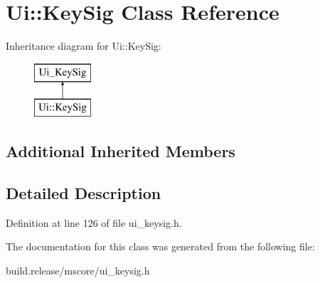 \hypertarget{class_ui_1_1_key_sig}{}\section{Ui\+:\+:Key\+Sig Class Reference}
\label{class_ui_1_1_key_sig}
Inheritance diagram for Ui\+:\+:Key\+Sig\+:\begin{figure}[H]
\begin{center}
\leavevmode
\includegraphics[height=2.000000cm]{class_ui_1_1_key_sig}
\end{center}
\end{figure}
\subsection*{Additional Inherited Members}


\subsection{Detailed Description}


Definition at line 126 of file ui\+\_\+keysig.\+h.



The documentation for this class was generated from the following file\+:\begin{DoxyCompactItemize}
\item 
build.\+release/mscore/ui\+\_\+keysig.\+h\end{DoxyCompactItemize}
